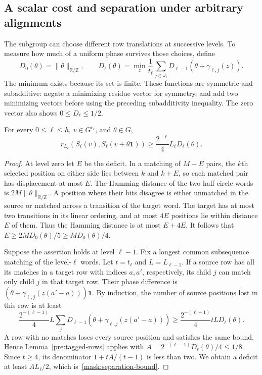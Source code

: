 \subsection{A scalar cost and separation under arbitrary alignments}
The subgroup can choose different row translations at successive levels.
To measure how much of a uniform phase survives those choices, define
\begin{equation}\label{mask:phase-cost}
 D_0(\theta)=\|\theta\|_{\mathbb R/\mathbb Z},\qquad
 D_\ell(\theta)=\min_z\frac1{t_\ell}\sum_{j\in J_\ell}
        D_{\ell-1}(\theta+\gamma_{\ell,j}(z)).
\end{equation}
The minimum exists because its set is finite. These functions are symmetric
and subadditive: negate a minimizing residue vector for symmetry, and add
two minimizing vectors before using the preceding subadditivity inequality.
The zero vector also shows $0\leq D_\ell\leq1/2$.

\begin{lemma}\label{mask:separation}
For every $0\leq\ell\leq h$, $v\in G^{r_\ell}$, and $\theta\in G$,
\begin{equation}\label{mask:separation-bound}
 r_{L_\ell}(S_\ell(v),S_\ell(v+\theta\mathbf1))
 \geq\frac{2^{-\ell}}4L_\ell D_\ell(\theta).
\end{equation}
\end{lemma}
\begin{proof}
At level zero let $E$ be the deficit. In a matching of $M-E$ pairs, the
$k$th selected position on either side lies between $k$ and $k+E$, so each
matched pair has displacement at most $E$. The Hamming distance of the two
half-circle words is $2M\|\theta\|_{\mathbb R/\mathbb Z}$. A position where
their bits disagree is either unmatched in the source or matched across a
transition of the target word. The target has at most two transitions in
its linear ordering, and at most $4E$ positions lie within distance $E$ of
them. Thus the Hamming distance is at most $E+4E$. It follows that
$E\geq2MD_0(\theta)/5\geq MD_0(\theta)/4$.

Suppose the assertion holds at level $\ell-1$. Fix a longest common
subsequence matching of the level-$\ell$ words. Let $t=t_\ell$ and
$L=L_{\ell-1}$. If a source row has all its matches in a target row with
indices $a,a'$, respectively, its child $j$ can match only child $j$ in
that target row. Their phase difference is
$(\theta+\gamma_{\ell,j}(z(a'-a)))\mathbf1$. By induction, the number of
source positions lost in this row is at least
\[
 \frac{2^{-(\ell-1)}}4L\sum_j
 D_{\ell-1}(\theta+\gamma_{\ell,j}(z(a'-a)))
 \geq\frac{2^{-(\ell-1)}}4tL D_\ell(\theta).
\]
A row with no matches loses every source position and satisfies the same
bound. Hence Lemma~\ref{pre:tagged-rows} applies with
$A=2^{-(\ell-1)}D_\ell(\theta)/4\leq1/8$. Since $t\geq4$, its denominator
$1+tA/(t-1)$ is less than two. We obtain a deficit at least
$AL_\ell/2$, which is~\eqref{mask:separation-bound}.
\end{proof}

